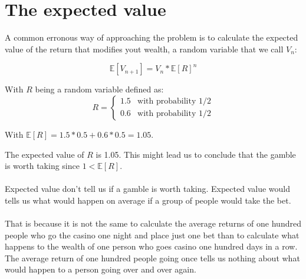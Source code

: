 \documentclass[12pt]{article}
\begin{document}
\section{The expected value}
A common erronous way of approaching the problem is to calculate the expected value of the return that modifies yout wealth, a random variable that we call $V_n$:

\begin{equation*}
  \mathbb{E}[V_{n+1}] = V_{n} * \mathbb{E}[R]^n
\end{equation*}

With $R$ being a random variable defined as:
\begin{equation*}
R = \left\{
	\begin{array}{ll}
		1.5 & \mbox{with probability 1/2} \\
		0.6 & \mbox{with probability 1/2}
	\end{array}
\right.
\end{equation*}

With $\mathbb{E}[R] = 1.5 * 0.5 + 0.6 * 0.5 = 1.05$.

The expected value of $R$ is 1.05. This might lead us to conclude that the gamble is worth taking since $1 < \mathbb{E}[R]$.
\\\\
Expected value don't tell us if a gamble is worth taking. Expected value would tells us what would happen on average if a group of people would take the bet.
\\\\
That is because it is not the same to calculate the average returns of one hundred people who go the casino one night and place just one bet than to calculate what happens to the wealth of one person who goes casino one hundred days in a row. The average return of one hundred people going once tells us nothing about what would happen to a person going over and over again. 
\end{document}
